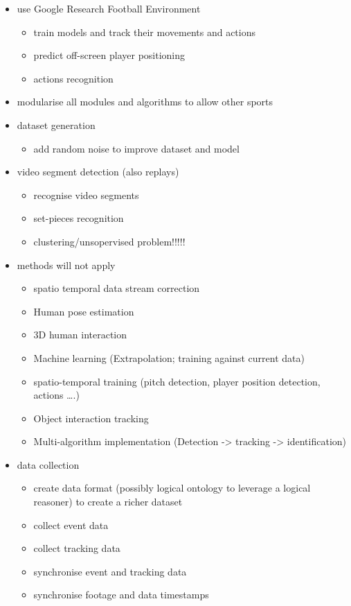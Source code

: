 \documentclass[
11pt,
twoside
]{report}
\begin{document}
\begin{itemize}
\item
  use Google Research Football Environment

  \begin{itemize}
  \item
    train models and track their movements and actions
  \item
    predict off-screen player positioning
  \item
    actions recognition
  \end{itemize}
\item
  modularise all modules and algorithms to allow other sports
\item
  dataset generation

  \begin{itemize}
  \item
    add random noise to improve dataset and model
  \end{itemize}
\item
  video segment detection (also replays)

  \begin{itemize}
  \item
    recognise video segments
  \item
    set-pieces recognition
  \item
    clustering/unsopervised problem!!!!!
  \end{itemize}
\item
  methods will not apply

  \begin{itemize}
  \item
    spatio temporal data stream correction
  \item
    Human pose estimation
  \item
    3D human interaction
  \item
    Machine learning (Extrapolation; training against current data)
  \item
    spatio-temporal training (pitch detection, player position
    detection, actions \ldots.)
  \item
    Object interaction tracking
  \item
    Multi-algorithm implementation (Detection -\textgreater{} tracking
    -\textgreater{} identification)
  \end{itemize}
\item
  data collection

  \begin{itemize}
  \item
    create data format (possibly logical ontology to leverage a logical
    reasoner) to create a richer dataset
  \item
    collect event data
  \item
    collect tracking data
  \item
    synchronise event and tracking data
  \item
    synchronise footage and data timestamps


\end{itemize}
\end{itemize}
\end{document}
